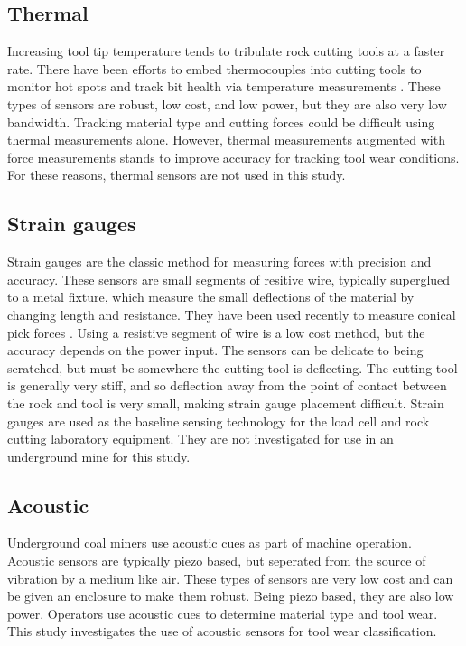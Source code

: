\subsection{Thermal}
Increasing tool tip temperature tends to tribulate rock cutting tools at a faster rate.
There have been efforts to embed thermocouples into cutting tools 
to monitor hot spots and track bit health via temperature measurements \cite{SHAO201839}.
These types of sensors are robust, low cost, and low power, but they are also very low bandwidth.
Tracking material type and cutting forces could be difficult using thermal measurements alone.
However, thermal measurements augmented with force measurements stands to improve accuracy for 
tracking tool wear conditions. For these reasons, thermal sensors are not used in this study.

\subsection{Strain gauges}
Strain gauges are the classic method for measuring forces with precision and accuracy.
These sensors are small segments of resitive wire, typically superglued to a metal fixture, 
which measure the small deflections of the material by changing length and resistance.
They have been used recently to measure conical pick forces \cite{s23239521}.
Using a resistive segment of wire is a low cost method, but the accuracy depends on the power input.
The sensors can be delicate to being scratched, but must be somewhere the cutting tool is deflecting.
The cutting tool is generally very stiff, and so deflection away from the point of contact between the rock
and tool is very small, making strain gauge placement difficult.
Strain gauges are used as the baseline sensing technology for the load cell and rock cutting laboratory equipment.
They are not investigated for use in an underground mine for this study.

\subsection{Acoustic}
Underground coal miners use acoustic cues as part of machine operation.
Acoustic sensors are typically piezo based, but seperated from the source of vibration by a medium like air.
These types of sensors are very low cost and can be given an enclosure to make them robust. 
Being piezo based, they are also low power. 
Operators use acoustic cues to determine material type and tool wear.
This study investigates the use of acoustic sensors for tool wear classification. 

